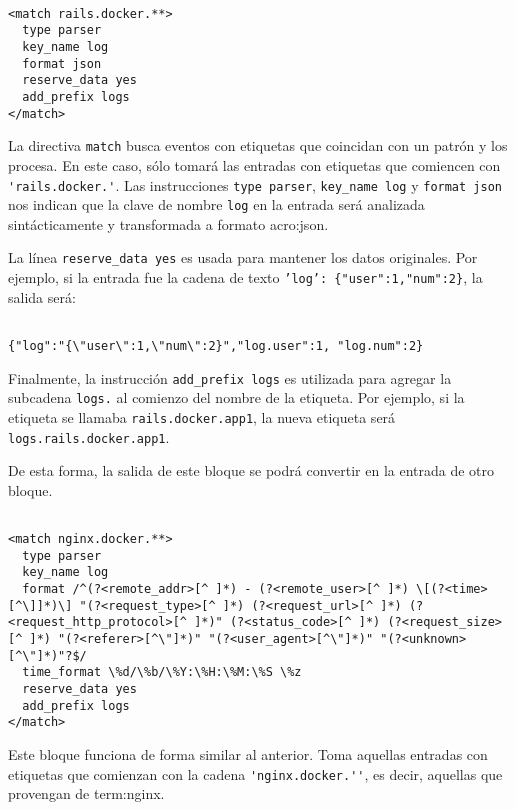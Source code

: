 \begin{lstlisting}

<match rails.docker.**>
  type parser
  key_name log
  format json
  reserve_data yes
  add_prefix logs
</match>

\end{lstlisting}

La directiva \lstinline{match} busca eventos con etiquetas que coincidan con un
patrón y los procesa. En este caso, sólo tomará las entradas con etiquetas
que comiencen con \lstinline{'rails.docker.'}. Las instrucciones
\lstinline{type parser}, \lstinline{key_name log} y \lstinline{format json}
nos indican que la clave de nombre \lstinline{log} en la entrada será analizada
sintácticamente y transformada a formato \gls{acro:json}.

La línea \lstinline{reserve_data yes} es usada para mantener los datos
originales. Por ejemplo, si la entrada fue la cadena de texto
\texttt{'log': \{"user":1,"num":2\}}, la salida será:

\begin{lstlisting}

{"log":"{\"user\":1,\"num\":2}","log.user":1, "log.num":2}

\end{lstlisting}

Finalmente, la instrucción \lstinline{add_prefix logs} es utilizada para
agregar la subcadena \lstinline{logs.} al comienzo del nombre de la etiqueta.
Por ejemplo, si la etiqueta se llamaba \lstinline{rails.docker.app1}, la nueva
etiqueta será \lstinline{logs.rails.docker.app1}.

De esta forma, la salida de este bloque se podrá convertir en la entrada de
otro bloque.

\begin{lstlisting}

<match nginx.docker.**>
  type parser
  key_name log
  format /^(?<remote_addr>[^ ]*) - (?<remote_user>[^ ]*) \[(?<time>[^\]]*)\] "(?<request_type>[^ ]*) (?<request_url>[^ ]*) (?<request_http_protocol>[^ ]*)" (?<status_code>[^ ]*) (?<request_size>[^ ]*) "(?<referer>[^\"]*)" "(?<user_agent>[^\"]*)" "(?<unknown>[^\"]*)"?$/
  time_format \%d/\%b/\%Y:\%H:\%M:\%S \%z
  reserve_data yes
  add_prefix logs
</match>

\end{lstlisting}

Este bloque funciona de forma similar al anterior. Toma aquellas entradas con
etiquetas que comienzan con la cadena \lstinline{'nginx.docker.''}, es decir,
aquellas que provengan de \gls{term:nginx}.

